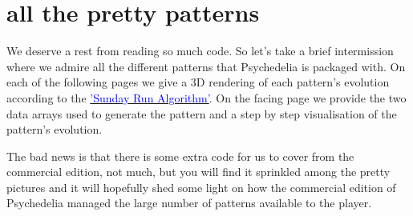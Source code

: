 \chapter{all the pretty patterns} 
\label{sec:patterns}
\lstset{style=6502Style}

We deserve a rest from reading so much code. So let's take a brief intermission where
we admire all the different patterns that Psychedelia is packaged with. On each of the following
pages we give a 3D rendering of each pattern's evolution according to the
\hyperref[sec:listing_pattern]{\textcolor{blue}{'Sunday Run Algorithm'}}.
On the facing page we provide the two data arrays used to generate the pattern and a step by step
visualisation of the pattern's evolution.

The bad news is that there is some extra code for us to cover from the commercial edition, not much,
but you will find it sprinkled among the pretty pictures and it will hopefully shed some light
on how the commercial edition of Psychedelia managed the large number of patterns available to the
player.

